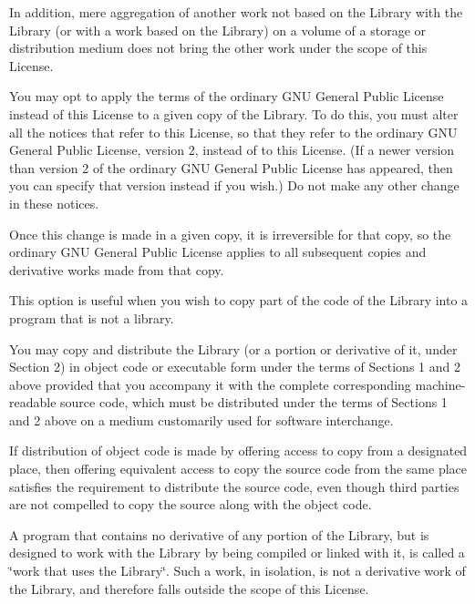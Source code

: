 In addition, mere aggregation of another work not based on the Library with the Library (or with a work based on the Library) on a volume of a storage or distribution medium does not bring the other work under the scope of this License.


\begin{DoxyEnumerate}
\item You may opt to apply the terms of the ordinary G\+N\+U General Public License instead of this License to a given copy of the Library. To do this, you must alter all the notices that refer to this License, so that they refer to the ordinary G\+N\+U General Public License, version 2, instead of to this License. (If a newer version than version 2 of the ordinary G\+N\+U General Public License has appeared, then you can specify that version instead if you wish.) Do not make any other change in these notices.
\end{DoxyEnumerate}

Once this change is made in a given copy, it is irreversible for that copy, so the ordinary G\+N\+U General Public License applies to all subsequent copies and derivative works made from that copy.

This option is useful when you wish to copy part of the code of the Library into a program that is not a library.


\begin{DoxyEnumerate}
\item You may copy and distribute the Library (or a portion or derivative of it, under Section 2) in object code or executable form under the terms of Sections 1 and 2 above provided that you accompany it with the complete corresponding machine-\/readable source code, which must be distributed under the terms of Sections 1 and 2 above on a medium customarily used for software interchange.
\end{DoxyEnumerate}

If distribution of object code is made by offering access to copy from a designated place, then offering equivalent access to copy the source code from the same place satisfies the requirement to distribute the source code, even though third parties are not compelled to copy the source along with the object code.


\begin{DoxyEnumerate}
\item A program that contains no derivative of any portion of the Library, but is designed to work with the Library by being compiled or linked with it, is called a \char`\"{}work that uses the Library\char`\"{}. Such a work, in isolation, is not a derivative work of the Library, and therefore falls outside the scope of this License.
\end{DoxyEnumerate}

